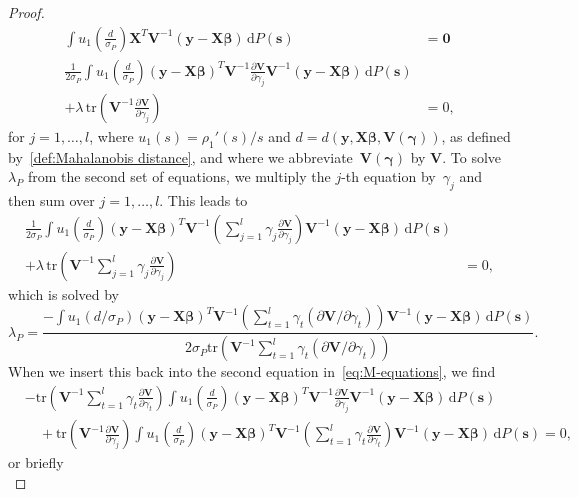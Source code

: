 \documentclass{article}
\numberwithin{equation}{section}
\theoremstyle{plain}
\newcommand{\dd}{\mathrm{d}}
\newcommand{\bbeta}{\bm\beta}
\newcommand{\bgamma}{\bm\gamma}
\newcommand{\by}{\mathbf{y}}
\newcommand{\bs}{\mathbf{s}}
\newcommand{\bX}{\mathbf{X}}
\newcommand{\bV}{\mathbf{V}}
\begin{document}
\begin{proof}
\begin{equation}
\label{eq:M-equations}
\begin{split}
\int
u_1\left(\frac{d}{\sigma_P}\right)
\bX^T\bV^{-1}(\by-\bX\bbeta)
\,\dd P(\bs)
&=
\mathbf{0}\\
\frac{1}{2\sigma_P}
\int
u_1\left(\frac{d}{\sigma_P}\right)
(\by-\bX\bbeta)^T\bV^{-1}
\frac{\partial \bV}{\partial \gamma_j}
\bV^{-1}(\by-\bX\bbeta)
\,\dd P(\mathbf{s})\\
+
\lambda
\,
\mathrm{tr}\left(\bV^{-1}\frac{\partial \bV}{\partial \gamma_j}\right)
&=0,
\end{split}
\end{equation}
for $j=1,\ldots,l$,
where $u_1(s)=\rho_1'(s)/s$ and $d=d(\by,\bX\bbeta,\bV(\bgamma))$, as defined by~\eqref{def:Mahalanobis distance},
and where we abbreviate~$\bV(\bgamma)$ by $\bV$.
To solve $\lambda_P$ from the second set of equations, we multiply the $j$-th equation by~$\gamma_j$ and then
sum over $j=1,\ldots,l$.
This leads to
\[
\begin{split}
\frac{1}{2\sigma_P}
\int
u_1\left(\frac{d}{\sigma_P}\right)
(\by-\bX\bbeta)^T\bV^{-1}
\left(
\sum_{j=1}^l\gamma_j\frac{\partial \bV}{\partial \gamma_j}
\right)
\bV^{-1}(\by-\bX\bbeta)
\,\dd P(\mathbf{s})\\
+
\lambda\,\mathrm{tr}\left(\bV^{-1}\sum_{j=1}^l\gamma_j\frac{\partial \bV}{\partial \gamma_j}\right)
&=0,
\end{split}
\]
which is solved by
\[
\lambda_P
=
\frac{\displaystyle
-\int
u_1(d/\sigma_P)
(\by-\bX\bbeta)^T\bV^{-1}
\left(
\sum_{t=1}^l\gamma_t(\partial \bV/\partial \gamma_t)
\right)
\bV^{-1}(\by-\bX\bbeta)
\,\dd P(\mathbf{s})}{\displaystyle 
2\sigma_P\mathrm{tr}\left(\bV^{-1}
\sum_{t=1}^l\gamma_t(\partial \bV/\partial \gamma_t)\right)}.
\]
When we insert this back into the second equation in~\eqref{eq:M-equations}, we find
\[
\begin{split}
&
-\mathrm{tr}\left(\bV^{-1}\sum_{t=1}^l\gamma_t\frac{\partial \bV}{\partial \gamma_t}\right)
\int
u_1\left(\frac{d}{\sigma_P}\right)
(\by-\bX\bbeta)^T\bV^{-1}
\frac{\partial \bV}{\partial \gamma_j}
\bV^{-1}(\by-\bX\bbeta)
\,\dd P(\mathbf{s})\\
&\quad+
\mathrm{tr}\left(\bV^{-1}\frac{\partial \bV}{\partial \gamma_j}\right)
\int
u_1\left(\frac{d}{\sigma_P}\right)
(\by-\bX\bbeta)^T\bV^{-1}
\left(
\sum_{t=1}^l\gamma_t\frac{\partial \bV}{\partial \gamma_t}
\right)
\bV^{-1}(\by-\bX\bbeta)
\,\dd P(\mathbf{s})
=0,
\end{split}
\]
or briefly
\begin{equation}
\label{eq:M-equations linear dependent}

\end{equation}
\end{proof}
\end{document}
